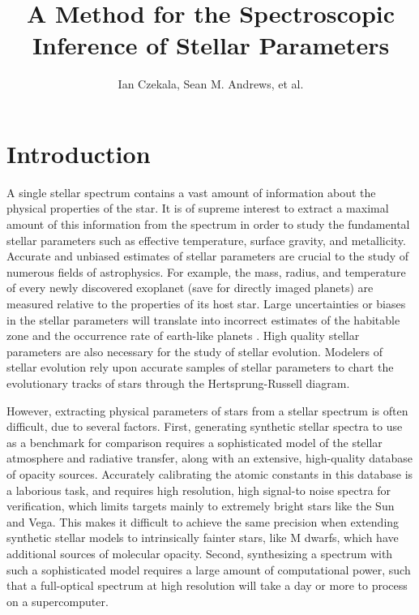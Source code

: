 \documentclass[iop,floatfix]{emulateapj}
\begin{document}
\graphicspath{{figs/}}



\title{A Method for the Spectroscopic Inference of Stellar Parameters}
\author{Ian Czekala, Sean M. Andrews, et al.}

\section{Introduction}
\label{sec:intro}

A single stellar spectrum contains a vast amount of information about the physical properties of the star. It is of supreme interest to extract a maximal amount of this information from the spectrum in order to study the fundamental stellar parameters such as effective temperature, surface gravity, and metallicity. Accurate and unbiased estimates of stellar parameters are crucial to the study of numerous fields of astrophysics. For example, the mass, radius, and temperature of every newly discovered exoplanet (save for directly imaged planets) are measured relative to the properties of its host star. Large uncertainties or biases in the stellar parameters will translate into incorrect estimates of the habitable zone and the occurrence rate of earth-like planets \citep{kane14}. High quality stellar parameters are also necessary for the study of stellar evolution. Modelers of stellar evolution rely upon accurate samples of stellar parameters to chart the evolutionary tracks of stars through the Hertsprung-Russell diagram.

However, extracting physical parameters of stars from a stellar spectrum is often difficult, due to several factors. First, generating synthetic stellar spectra to use as a benchmark for comparison requires a sophisticated model of the stellar atmosphere and radiative transfer, along with an extensive, high-quality database of opacity sources. Accurately calibrating the atomic constants in this database is a laborious task, and requires high resolution, high signal-to noise spectra for verification, which limits targets mainly to extremely bright stars like the Sun and Vega. This makes it difficult to achieve the same precision when extending synthetic stellar models to intrinsically fainter stars, like M dwarfs, which have additional sources of molecular opacity. Second,  synthesizing a spectrum with such a sophisticated model requires a large amount of computational power, such that a full-optical spectrum at high resolution will take a day or more to process on a supercomputer. 
\end{document}

